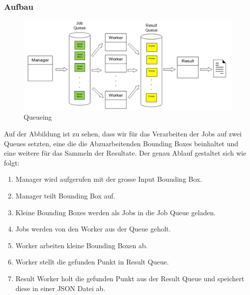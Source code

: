 \subsubsection{Aufbau}
\label{subsec:ablauf}
\begin{figure}[H]
\includegraphics[width=\textwidth]{images/queuing.png}
\caption[Queueing]{Queueing}
\end{figure}
Auf der Abbildung ist zu sehen, dass wir für das Verarbeiten der Jobs auf zwei Queues setzten, eine die die Abzuarbeitenden Bounding Boxes beinhaltet und eine weitere für das Sammeln der Resultate. Der genau Ablauf gestaltet sich wie folgt:
\begin{enumerate}
		\item Manager wird aufgerufen mit der grosse Input Bounding Box.
		\item Manager teilt Bounding Box auf.
		\item Kleine Bounding Boxes werden als Jobs in die Job Queue geladen.
		\item Jobs werden von den Worker aus der Queue geholt.
		\item Worker arbeiten kleine Bounding Boxen ab.
		\item Worker stellt die gefunden Punkt in Result Queue.
		\item Result Worker holt die gefunden Punkt aus der Result Queue und speichert diese in einer JSON Datei ab. 
\end{enumerate}
\newpage









